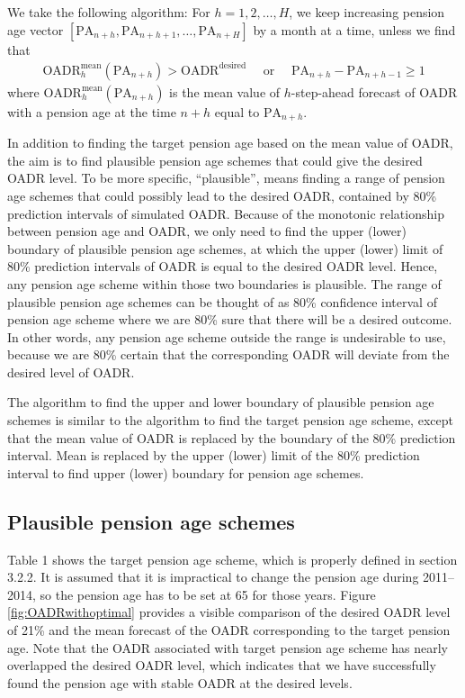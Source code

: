 \documentclass[11pt,a4paper,]{article}
\begin{document}
We take the following algorithm:
For \(h=1,2,\dots,H\), we keep increasing pension age vector \([\text{PA}_{n+h},\text{PA}_{n+h+1},\dots,\text{PA}_{n+H}]\) by a month at a time, unless we find that
\begin{align*}
  \text{OADR}^{\text{mean}}_h(\text{PA}_{n+h})> \text{OADR}^{\text{desired}} \quad \text{~or~}\quad  \text{PA}_{n+h}-\text{PA}_{n+h-1}\geq 1
\end{align*}
where \(\text{OADR}^{\text{mean}}_h(\text{PA}_{n+h})\) is the mean value of \(h\)-step-ahead forecast of OADR with a pension age at the time \(n+h\) equal to \(\text{PA}_{n+h}\).

In addition to finding the target pension age based on the mean value of OADR, the aim is to find plausible pension age schemes that could give the desired OADR level. To be more specific, ``plausible'', means finding a range of pension age schemes that could possibly lead to the desired OADR, contained by 80\% prediction intervals of simulated OADR. Because of the monotonic relationship between pension age and OADR, we only need to find the upper (lower) boundary of plausible pension age schemes, at which the upper (lower) limit of 80\% prediction intervals of OADR is equal to the desired OADR level. Hence, any pension age scheme within those two boundaries is plausible. The range of plausible pension age schemes can be thought of as 80\% confidence interval of pension age scheme where we are 80\% sure that there will be a desired outcome. In other words, any pension age scheme outside the range is undesirable to use, because we are 80\% certain that the corresponding OADR will deviate from the desired level of OADR.

The algorithm to find the upper and lower boundary of plausible pension age schemes is similar to the algorithm to find the target pension age scheme, except that the mean value of OADR is replaced by the boundary of the 80\% prediction interval. Mean is replaced by the upper (lower) limit of the 80\% prediction interval to find upper (lower) boundary for pension age schemes.

\hypertarget{plausible-pension-age-schemes}{%
\subsection{Plausible pension age schemes}\label{plausible-pension-age-schemes}}

Table 1 shows the target pension age scheme, which is properly defined in section 3.2.2. It is assumed that it is impractical to change the pension age during 2011--2014, so the pension age has to be set at 65 for those years. Figure \ref{fig:OADRwithoptimal} provides a visible comparison of the desired OADR level of 21\% and the mean forecast of the OADR corresponding to the target pension age. Note that the OADR associated with target pension age scheme has nearly overlapped the desired OADR level, which indicates that we have successfully found the pension age with stable OADR at the desired levels.
\end{document}
